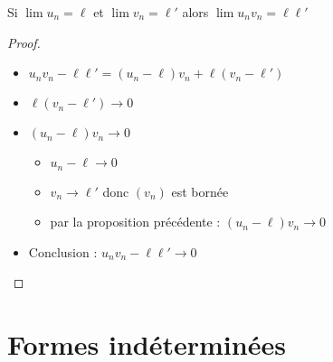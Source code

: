 \begin{frame}

\begin{proposition}
	Si \quad $\lim u_n = \ell$ \quad et \quad $\lim v_n = \ell'$ \quad alors \quad $\lim u_n v_n = \ell \ell'$
\end{proposition}
\pause
\begin{proof}

\begin{itemize}
  \item $u_nv_n-\ell\ell'=(u_n-\ell)v_n+\ell(v_n-\ell')$
\pause  
  \item $\ell(v_n-\ell') \to 0$
\pause  
  \item $(u_n-\ell)v_n \to 0$ 
\pause      
  \begin{itemize} 
    \item $u_n-\ell \to 0$
\pause      
    \item $v_n \to \ell'$ donc $(v_n)$ est bornée
\pause      
    \item par la proposition précédente : $(u_n-\ell)v_n \to 0$
  \end{itemize}
\pause  
  \item Conclusion : $u_nv_n-\ell\ell' \to 0$
\end{itemize}


\end{proof}

\end{frame}

\section{Formes indéterminées} 

